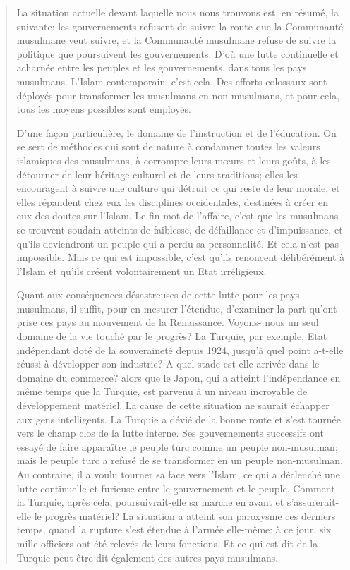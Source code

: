 \begin{quote}
La situation actuelle devant laquelle nous nous trouvons est, en résumé,
la suivante: les gouvernements refusent de suivre la route que la
Communauté musulmane veut suivre, et la Communauté musulmane refuse de
suivre la politique que poursuivent les gouvernements. D'où une lutte
continuelle et acharnée entre les peuples et les gouvernements, dans
tous les pays musulmans. L'Islam contemporain, c'est cela. Des efforts
colossaux sont déployés pour transformer les musulmans en non-musulmans,
et pour cela, tous les moyens possibles sont employés.

D'une façon particulière, le domaine de l'instruction et de l'éducation.
On se sert de méthodes qui sont de nature à condamner toutes les valeurs
islamiques des musulmans, à corrompre leurs mœurs et leurs goûts, à les
détourner de leur héritage culturel et de leurs traditions; elles les
encouragent à suivre une culture qui détruit ce qui reste de leur
morale, et elles répandent chez eux les disciplines occidentales,
destinées à créer en eux des doutes sur l'Islam. Le fin mot de
l'affaire, c'est que les musulmans se trouvent soudain atteints de
faiblesse, de défaillance et d'impuissance, et qu'ils deviendront un
peuple qui a perdu sa personnalité. Et cela n'est pas impossible. Mais
ce qui est impossible, c'est qu'ils renoncent délibérément à l'Islam et
qu'ils créent volontairement un Etat irréligieux.

Quant aux conséquences désastreuses de cette lutte pour les pays
musulmans, il suffit, pour en mesurer l'étendue, d'examiner la part
qu'ont prise ces pays au mouvement de la Renaissance. Voyons- nous un
seul domaine de la vie touché par le progrès? La Turquie, par exemple,
Etat indépendant doté de la souveraineté depuis 1924, jusqu'à quel point
a-t-elle réussi à développer son industrie? A quel stade est-elle
arrivée dans le domaine du commerce? alors que le Japon, qui a atteint
l'indépendance en même temps que la Turquie, est parvenu à un niveau
incroyable de développement matériel. La cause de cette situation ne
saurait échapper aux gens intelligents. La Turquie a dévié de la bonne
route et s'est tournée vers le champ clos de la lutte interne. Ses
gouvernements successifs ont essayé de faire apparaître le peuple turc
comme un peuple non-musulman; mais le peuple turc a refusé de se
transformer en un peuple non-musulman. Au contraire, il a voulu tourner
sa face vers l'Islam, ce qui a déclenché une lutte continuelle et
furieuse entre le gouvernement et le peuple. Comment la Turquie, après
cela, poursuivrait-elle sa marche en avant et s'assurerait-elle le
progrès matériel? La situation a atteint son paroxysme ces derniers
temps, quand la rupture s'est étendue à l'armée elle-même: à ce jour,
six mille officiers ont été relevés de leurs fonctions. Et ce qui est
dit de la Turquie peut être dit également des autres pays musulmans.


\end{quote}

